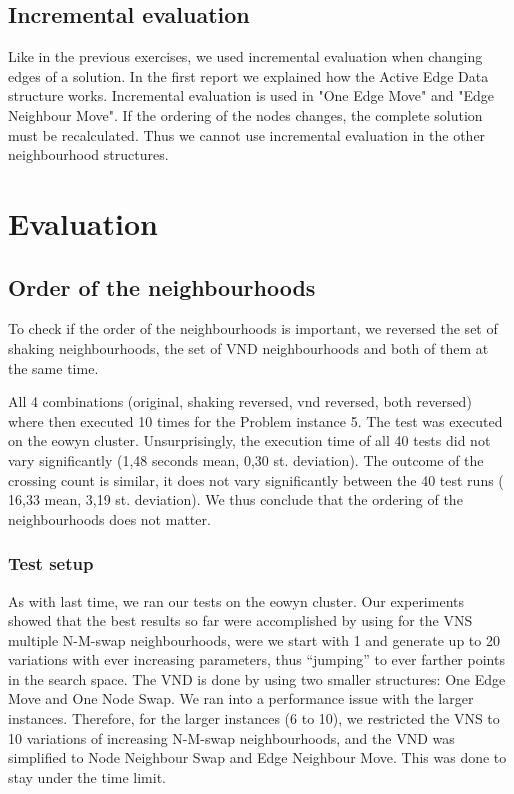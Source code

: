 \documentclass [11pt]{article}
\begin{document}
\subsection{Incremental evaluation}

Like in the previous exercises, we used incremental evaluation when changing edges of a solution. In the first report we explained how the Active Edge Data structure works. Incremental evaluation is used in "One Edge Move" and "Edge Neighbour Move". If the ordering of the nodes changes, the complete solution must be recalculated. Thus we cannot use incremental evaluation in the other neighbourhood structures.


\section{Evaluation}

\subsection{Order of the neighbourhoods}

To check if the order of the neighbourhoods is important, we reversed the set of shaking neighbourhoods, the set of VND neighbourhoods and both of them at the same time.

All 4 combinations (original, shaking reversed, vnd reversed, both reversed) where then executed 10 times for the Problem instance 5. The test was executed on the eowyn cluster. Unsurprisingly, the execution time of all 40 tests did not vary significantly (1,48 seconds mean, 0,30 st. deviation). The outcome of the crossing count is similar, it does not vary significantly between the 40 test runs ( 16,33 mean, 3,19 st. deviation). We thus conclude that the ordering of the neighbourhoods does not matter.

\subsubsection{Test setup}
As with last time, we ran our tests on the eowyn cluster. Our experiments showed that the best results so far were accomplished by using for the VNS multiple N-M-swap neighbourhoods, were we start with 1 and generate up to 20 variations with ever increasing parameters, thus ``jumping'' to ever farther points in the search space. The VND is done by using two smaller structures:  One Edge Move and One Node Swap. We ran into a performance issue with the larger instances. Therefore, for the larger instances (6 to 10), we restricted the VNS to 10 variations of increasing N-M-swap neighbourhoods, and the VND was simplified to Node Neighbour Swap and Edge Neighbour Move. This was done to stay under the time limit. 
\end{document}
